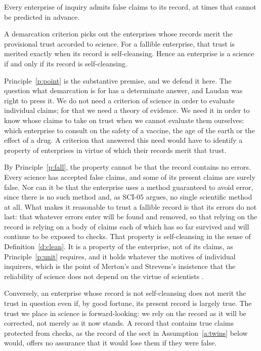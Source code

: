 \documentclass{situationist-preprint}
\begin{document}
\begin{principle}[Fallibilism]\label{p:fall}
Every enterprise of inquiry admits false claims to its record, at times that cannot be predicted in advance.
\end{principle}

\begin{principle}\label{p:point}
A demarcation criterion picks out the enterprises whose records merit the provisional trust accorded to science. For a fallible enterprise, that trust is merited exactly when its record is self-cleansing. Hence an enterprise is a science if and only if its record is self-cleansing.
\end{principle}

Principle~\ref{p:point} is the substantive premise, and we defend it here. The question what demarcation is for has a determinate answer, and Laudan was right to press it. We do not need a criterion of science in order to evaluate individual claims; for that we need a theory of evidence. We need it in order to know whose claims to take on trust when we cannot evaluate them ourselves: which enterprise to consult on the safety of a vaccine, the age of the earth or the effect of a drug. A criterion that answered this need would have to identify a property of enterprises in virtue of which their records merit that trust.

By Principle~\ref{p:fall}, the property cannot be that the record contains no errors. Every science has accepted false claims, and some of its present claims are surely false. Nor can it be that the enterprise uses a method guaranteed to avoid error, since there is no such method and, as SCI-05 argues, no single scientific method at all. What makes it reasonable to trust a fallible record is that its errors do not last: that whatever errors enter will be found and removed, so that relying on the record is relying on a body of claims each of which has so far survived and will continue to be exposed to checks. That property is self-cleansing in the sense of Definition~\ref{d:clean}. It is a property of the enterprise, not of its claims, as Principle~\ref{p:unit} requires, and it holds whatever the motives of individual inquirers, which is the point of Merton's and Strevens's insistence that the reliability of science does not depend on the virtue of scientists \citep{Merton1973,Strevens2020}.

Conversely, an enterprise whose record is not self-cleansing does not merit the trust in question even if, by good fortune, its present record is largely true. The trust we place in science is forward-looking: we rely on the record as it will be corrected, not merely as it now stands. A record that contains true claims protected from checks, as the record of the sect in Assumption~\ref{a:twins} below would, offers no assurance that it would lose them if they were false.
\end{document}
